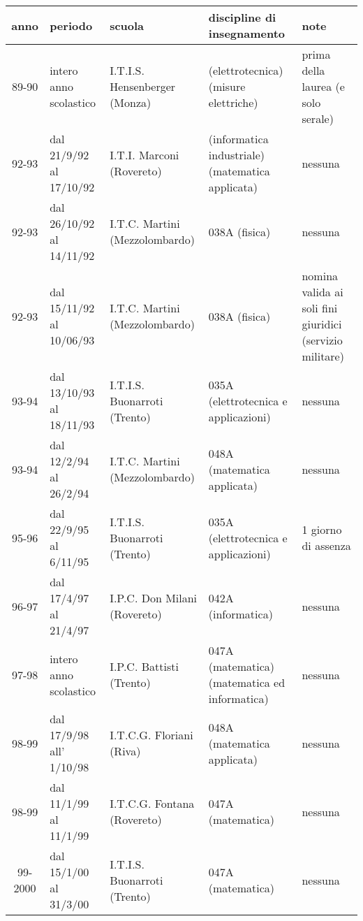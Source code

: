 \documentclass[11pt]{article}
\begin{document}
\begin{center}
\begin{tabular}[c]{||c|p{0.80in}|p{1.25in}|p{1.25in}|p{1.25in}||}
 \hline \hline
  anno      & periodo & scuola & discipline di insegnamento & note\\
 \hline \hline
  89-90     & intero anno scolastico & I.T.I.S. Hensenberger (Monza)
            & (elettrotecnica) (misure elettriche)
            & prima della laurea (e solo serale) \\
 \hline \hline
  92-93     & dal 21/9/92 al 17/10/92
            & I.T.I. Marconi (Rovereto)
            & (informatica industriale) %
              (matematica applicata) %
            & nessuna \\
  92-93     & dal 26/10/92 al 14/11/92 & I.T.C. Martini (Mezzolombardo)
            & 038A (fisica) & nessuna \\
  92-93     & dal 15/11/92 al 10/06/93 & I.T.C. Martini (Mezzolombardo)
            & 038A (fisica)
            & nomina valida ai soli fini giuridici (servizio militare) \\
 \hline \hline
  93-94     & dal 13/10/93 al 18/11/93 & I.T.I.S. Buonarroti (Trento)
            & 035A (elettrotecnica e applicazioni) & nessuna \\
  93-94     & dal 12/2/94 al 26/2/94 & I.T.C. Martini (Mezzolombardo)
            & 048A (matematica applicata) & nessuna \\
 \hline \hline
  95-96     & dal 22/9/95 al 6/11/95 & I.T.I.S. Buonarroti (Trento)
            & 035A (elettrotecnica e applicazioni) & 1 giorno di assenza \\
 \hline \hline
  96-97   & dal 17/4/97 al 21/4/97 & I.P.C. Don Milani (Rovereto)
            & 042A (informatica) & nessuna \\
 \hline \hline
  97-98     & intero anno scolastico & I.P.C. Battisti (Trento)
            & 047A (matematica) (matematica ed informatica)
            & nessuna \\
 \hline \hline
  98-99   & dal 17/9/98 all' 1/10/98 & I.T.C.G. Floriani (Riva)
            & 048A (matematica applicata) & nessuna \\
  98-99   & dal 11/1/99 al 11/1/99 & I.T.C.G. Fontana (Rovereto)
            & 047A (matematica) & nessuna \\
 \hline \hline
  99-2000   & dal 15/1/00 al 31/3/00 & I.T.I.S. Buonarroti (Trento)
            & 047A (matematica) & nessuna \\
 \hline \hline
\end{tabular}
\end{center}
\end{document}
